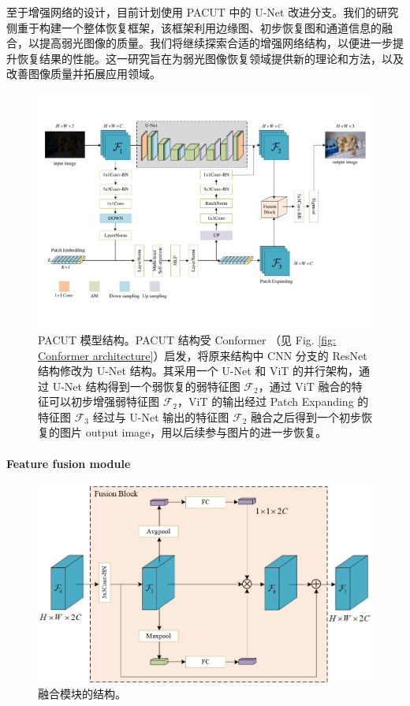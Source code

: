 \documentclass[a4paper, 10pt]{article}
\begin{document}
		至于增强网络的设计，目前计划使用 PACUT 中的 U-Net 改进分支。我们的研究侧重于构建一个整体恢复框架，该框架利用边缘图、初步恢复图和通道信息的融合，以提高弱光图像的质量。我们将继续探索合适的增强网络结构，以便进一步提升恢复结果的性能。这一研究旨在为弱光图像恢复领域提供新的理论和方法，以及改善图像质量并拓展应用领域。
		
		\begin{figure}[htb]
			\centering 
			\includegraphics[width=\columnwidth]{picture/LLIE/My Architecture/The proposed initial architecture}
			\caption{
				\label{fig: First Architecture} 
				PACUT 模型结构。PACUT 结构受 Conformer\cite{peng2021conformer} （见 Fig. \ref{fig: Conformer architecture}）启发，将原来结构中 CNN 分支的 ResNet 结构修改为 U-Net 结构。其采用一个 U-Net 和 ViT 的并行架构，通过 U-Net 结构得到一个弱恢复的弱特征图 $\mathcal{F}_2$，通过 ViT 融合的特征可以初步增强弱特征图 $\mathcal{F}_2$，ViT 的输出经过 Patch Expanding 的特征图 $\mathcal{F}_3$ 经过与 U-Net 输出的特征图 $\mathcal{F}_2$ 融合之后得到一个初步恢复的图片 output image，用以后续参与图片的进一步恢复。
			}
		\end{figure}
		
		\paragraph{Feature fusion module}
		
		\begin{figure}[htb]
			\centering 
			\includegraphics[width=0.7\columnwidth]{picture/LLIE/My Architecture/Fusion Block}
			\caption{
				\label{fig: Fusion Block} 
				融合模块的结构。
			}
		\end{figure}
		
\end{document}
